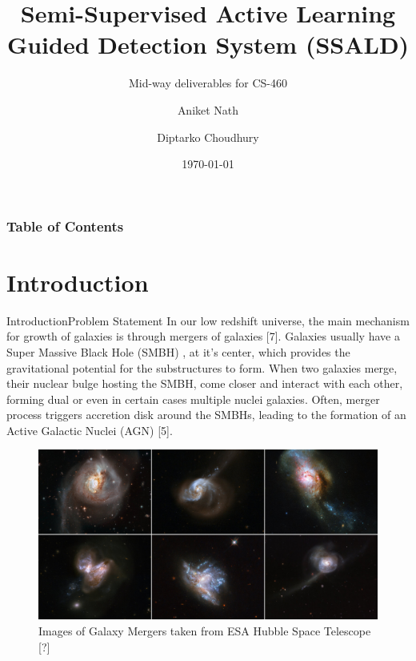 \documentclass{beamer}
\title[SSALD] %
{Semi-Supervised Active Learning Guided Detection System (SSALD)}
\subtitle{Mid-way deliverables for CS-460}
\author[] %
{Aniket Nath\inst{1}\inst{2} \and Diptarko Choudhury\inst{1}\inst{2}}
\institute[NISER] %
{
	\inst{1}%
	School of Physical Sciences\\
	National Institute of Science Education and Research, HBNI
	\and
	\inst{2}%
	School of Computer Sciences\\
	National Institute of Science Education and Research, HBNI

}
\date[\today] %
{\today}
\begin{document}
	
	\frame{\titlepage}
	
	
	\begin{frame}
		\frametitle{Table of Contents}
		\tableofcontents
	\end{frame}
	
	
\section{Introduction}
\begin{frame}[allowframebreaks]{Introduction}{Problem Statement}
	In our low redshift universe, the main mechanism for growth of galaxies is through mergers of galaxies [7]. Galaxies usually have a Super Massive Black Hole (SMBH) , at it's center, which provides the gravitational potential for the substructures to form. When two galaxies merge, their nuclear bulge hosting the SMBH, come closer and interact with each other, forming dual or even in certain cases multiple nuclei galaxies. Often, merger process triggers accretion disk around the SMBHs, leading to the formation of an Active Galactic Nuclei (AGN) [5].
	\begin{figure}
		\includegraphics[scale=0.15]{mergers.jpg}
		\caption{Images of Galaxy Mergers taken from ESA Hubble Space Telescope [?]}
	\end{figure}
\end{frame}
\end{document}
